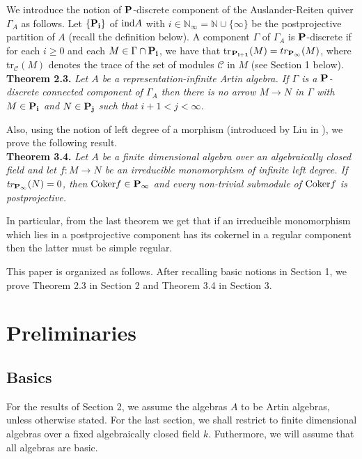 We introduce the notion of ${\bf P}$-discrete component of the Auslander-Reiten quiver $\Gamma_A$ as 
follows. Let $\{ \bf{P_i} \}$ of ${\rm ind}A$ with $i\in \mathbb{N}_{\infty}=\mathbb{N}\cup{\{ \infty} \}$
be the  postprojective partition of $A$ (recall the definition below). A component $\Gamma$ of $\Gamma_A$ 
is ${\bf P}$-discrete if for each $i\geq 0$ and each $M \in \Gamma \cap {\bf P_i}$, we have that 
tr$_{\bf P_{i+1}}(M) = tr_{\bf P_\infty} (M)$, where tr$_{\mathcal C}(M)$ denotes the trace of the set of 
modules ${\mathcal C}$ in $M$ (see Section 1 below). 
\vspace{.3 cm}\\
{\bf Theorem 2.3.} 
{\it
Let $A$ be a representation-infinite Artin algebra. If $\Gamma$ is a $\bf{P}$-discrete connected component of $\Gamma_A$
then there is no arrow $ M \rightarrow N$ in $\Gamma$ with $M \in \bf{P_i}$ and $N \in \bf{P_j}$ such that $i+1<j<{\infty}$.
}

\vspace{.3 cm}
Also, using the notion of left degree of a morphism (introduced by Liu in \cite{liu}), we prove 
the following result.
\vspace{.3 cm}\\
{\bf Theorem 3.4.} 
{\it
Let $A$ be a finite dimensional algebra over an algebraically closed field and let 
$f \colon M \longrightarrow N$ be an irreducible monomorphism of infinite left degree. If tr$_{\bf P_\infty}(N) = 0$, 
then ${\rm Coker}f\in{\bf P}_{\infty}$ and every non-trivial submodule of $ {\rm Coker}f$ is postprojective. 
}
\vspace{.3 cm}

In particular, from the last theorem we get that if an irreducible monomorphism which lies in a postprojective component has its cokernel in a regular component then the latter must be simple regular.  

This paper is organized as follows. After recalling basic notions in Section 1, we prove Theorem 2.3 in 
Section 2 and Theorem 3.4 in Section 3.

\section{Preliminaries}

\subsection{Basics}
For the results of Section 2, we assume  the algebras $A$ to be Artin algebras, unless otherwise stated. For the last section, we shall restrict to finite dimensional algebras over a fixed algebraically closed field $k$. Futhermore, we will assume that all algebras are basic.

